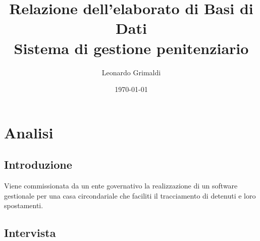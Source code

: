 \documentclass[a4paper,12pt]{report}
\title{Relazione dell'elaborato di Basi di Dati
    \\ Sistema di gestione penitenziario}
\author{Leonardo Grimaldi}
\date{\today}
\begin{document}
\maketitle
\tableofcontents
\chapter{Analisi}
\section{Introduzione}
Viene commissionata da un ente governativo la realizzazione di un software gestionale per una casa circondariale che faciliti il tracciamento di detenuti e loro spostamenti.
\section{Intervista}
\end{document}

